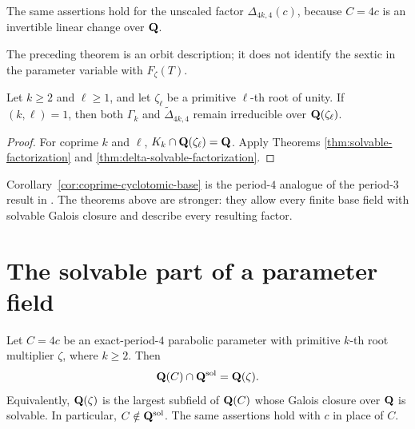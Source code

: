 The same assertions hold for the unscaled factor
$\Delta_{4k,4}(c)$, because $C=4c$ is an invertible linear change over
$\mathbf Q$.

\begin{remark}
The preceding theorem is an orbit description; it does not identify
the sextic in the parameter variable with $F_\zeta(T)$.
\end{remark}

\begin{corollary}
\label{cor:coprime-cyclotomic-base}
Let $k\ge2$ and $\ell\ge1$, and let $\zeta_\ell$ be a primitive
$\ell$-th root of unity.  If $(k,\ell)=1$, then both $\Gamma_k$ and
$\widetilde\Delta_{4k,4}$ remain irreducible over
$\mathbf Q(\zeta_\ell)$.
\end{corollary}

\begin{proof}
For coprime $k$ and $\ell$,
$K_k\cap\mathbf Q(\zeta_\ell)=\mathbf Q$.  Apply Theorems
\ref{thm:solvable-factorization} and
\ref{thm:delta-solvable-factorization}.
\end{proof}

\begin{remark}
Corollary~\ref{cor:coprime-cyclotomic-base} is the period-$4$ analogue
of the period-$3$ result in
\cite[Theorem~1.2]{KoizumiMurakamiSanoTakehira2025}.  The theorems
above are stronger: they allow every finite base field with solvable
Galois closure and describe every resulting factor.
\end{remark}

\section{The solvable part of a parameter field}

\begin{corollary}
\label{cor:maximal-solvable-parameter-field}
Let $C=4c$ be an exact-period-$4$ parabolic parameter with primitive
$k$-th root multiplier $\zeta$, where $k\ge2$.  Then
\[
 \mathbf Q(C)\cap\mathbf Q^{\mathrm{sol}}=\mathbf Q(\zeta).
\]
Equivalently, $\mathbf Q(\zeta)$ is the largest subfield of $\mathbf Q(C)$ whose
Galois closure over $\mathbf Q$ is solvable.  In particular,
$C\notin\mathbf Q^{\mathrm{sol}}$.  The same assertions hold with $c$ in
place of $C$.
\end{corollary}

